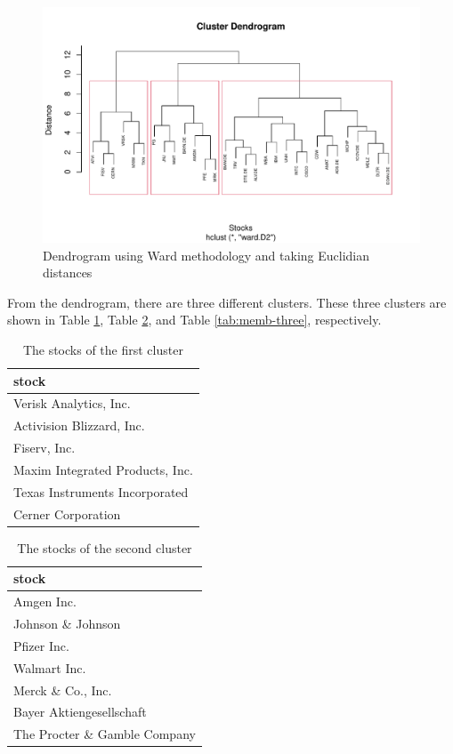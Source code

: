 \documentclass[11pt,a4paper,]{article}
\begin{document}
\begin{figure}
\centering
\includegraphics{ass2_files/figure-latex/ward-3-1.pdf}
\caption{\label{fig:ward-3}Dendrogram using Ward methodology and taking Euclidian distances}
\end{figure}

From the dendrogram, there are three different clusters. These three clusters are shown in Table \ref{tab:memb-w}, Table \ref{tab:memb-two}, and Table \ref{tab:memb-three}, respectively.

\begin{table}

\caption{\label{tab:memb-w}The stocks of the first cluster}
\centering
\begin{tabular}[t]{l}
\hline
stock\\
\hline
Verisk Analytics, Inc.\\
\hline
Activision Blizzard, Inc.\\
\hline
Fiserv, Inc.\\
\hline
Maxim Integrated Products, Inc.\\
\hline
Texas Instruments Incorporated\\
\hline
Cerner Corporation\\
\hline
\end{tabular}
\end{table}

\begin{table}

\caption{\label{tab:memb-two}The stocks of the second cluster}
\centering
\begin{tabular}[t]{l}
\hline
stock\\
\hline
Amgen Inc.\\
\hline
Johnson \& Johnson\\
\hline
Pfizer Inc.\\
\hline
Walmart Inc.\\
\hline
Merck \& Co., Inc.\\
\hline
Bayer Aktiengesellschaft\\
\hline
The Procter \& Gamble Company\\
\hline
\end{tabular}
\end{table}
\end{document}
